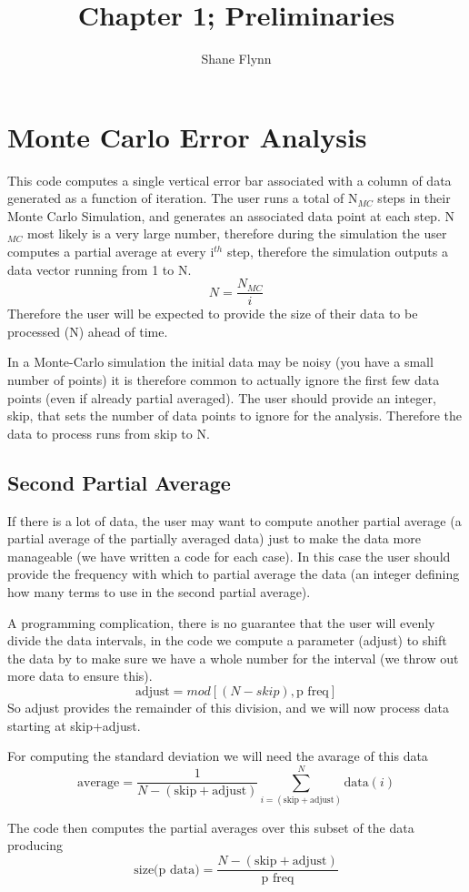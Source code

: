 \documentclass{article}
\title{Chapter 1; Preliminaries}
\author{Shane Flynn}
\newcommand{\be}{\begin{equation}}
\newcommand{\ee}{\end{equation}}
\begin{document}
\section*{Monte Carlo Error Analysis}
This code computes a single vertical error bar associated with a column of data generated as a function of iteration. 
The user runs a total of N$_{MC}$ steps in their Monte Carlo Simulation, and generates an associated data point at each step. 
N$_{MC}$ most likely is a very large number, therefore during the simulation the user computes a partial average at every i$^{th}$ step, therefore the simulation outputs a data vector running from 1 to N.
\be
N = \frac{N_{MC}}{i}
\ee
Therefore the user will be expected to provide the size of their data to be processed (N) ahead of time.

In a Monte-Carlo simulation the initial data may be noisy (you have a small number of points) it is therefore common to actually ignore the first few data points (even if already partial averaged). 
The user should provide an integer, skip, that sets the number of data points to ignore for the analysis. 
Therefore the data to process runs from skip to N.

\subsection*{Second Partial Average}
If there is a lot of data, the user may want to compute another partial average (a partial average of the partially averaged data) just to make the data more manageable (we have written a code for each case).
In this case the user should provide the frequency with which to partial average the data (an integer defining how many terms to use in the second partial average). 

A programming complication, there is no guarantee that the user will evenly divide the data intervals, in the code we compute a parameter (adjust) to shift the data by to make sure we have a whole number for the interval (we throw out more data to ensure this). 
\be
\text{adjust} = mod[(N-skip), \text{p freq}]
\ee
So adjust provides the remainder of this division, and we will now process data starting at skip+adjust. 

For computing the standard deviation we will need the avarage of this data
\be
\text{average} = \frac{1}{N - (\text{skip}+\text{adjust})} \sum_{i=(\text{skip}+\text{adjust})}^{N} \text{data}(i)
\ee

The code then computes the partial averages over this subset of the data producing 
\be
\text{size(p data)} = \frac{N - (\text{skip} + \text{adjust})}{\text{p freq}}
\ee
\end{document}
